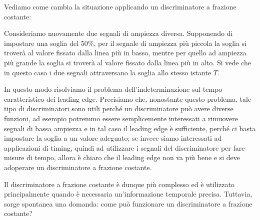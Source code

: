 Vediamo come cambia la situazione applicando un discriminatore a frazione costante:

\begin{esempio}
   \vspace{-0.45cm}
   \begin{figure}[H]
      \centering
   \end{figure}
   
   \vspace{-0.4cm}Consideriamo nuovamente due segnali di ampiezza diversa. Supponendo di impostare una soglia del 50\%, per il segnale di ampiezza più piccola la soglia si troverà al valore fissato dalla linea più in basso, mentre per quello ad ampiezza più grande la soglia si troverà al valore fissato dalla linea più in alto. Si vede che in questo caso i due segnali attraversano la soglia allo stesso istante $T$.
\end{esempio}

\vspace{-0.1cm}In questo modo risolviamo il problema dell'indeterminazione sul tempo caratteristico dei leading edge. Precisiamo che, nonostante questo problema, tale tipo di discriminatori sono utili perché un discriminatore può avere diverse funzioni, ad esempio potremmo essere semplicemente interessati a rimuovere segnali di bassa ampiezza e in tal caso il leading edge è sufficiente, perché ci basta impostare la soglia a un valore adeguato; se invece siamo interessati ad applicazioni di timing, quindi ad utilizzare i segnali del discriminatore per fare misure di tempo, allora è chiaro che il leading edge non va più bene e si deve adoperare un discriminatore a frazione costante.

Il discriminatore a frazione costante è dunque più complesso ed è utilizzato principalmente quando è necessaria un'informazione temporale precisa. Tuttavia, sorge spontanea una domanda: come può funzionare un discriminatore a frazione costante?

